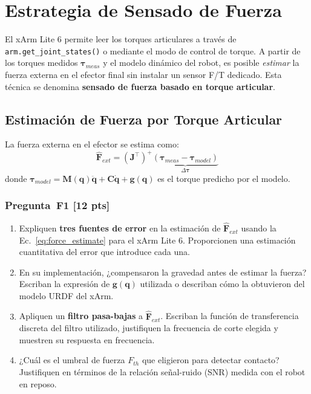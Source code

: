 \documentclass[journal,10pt,twoside]{IEEEtran}
\newcommand{\pts}[1]{\textcolor{tec_red}{\textbf{[#1 pts]}}}
\begin{document}
\section{Estrategia de Sensado de Fuerza}
\label{sec:force}

\begin{theorybox}
  El xArm Lite 6 permite leer los torques articulares a través de
  \texttt{arm.get\_joint\_states()} o mediante el modo de control de
  torque. A partir de los torques medidos $\bm{\tau}_{meas}$ y el
  modelo dinámico del robot, es posible \emph{estimar} la fuerza
  externa en el efector final sin instalar un sensor F/T dedicado.
  Esta técnica se denomina \textbf{sensado de fuerza basado en torque articular}.
\end{theorybox}

\subsection{Estimación de Fuerza por Torque Articular}

La fuerza externa en el efector se estima como:
\begin{equation}
  \hat{\bm{F}}_{ext} = \left(\bm{J}^\top\right)^+
    \underbrace{\left(\bm{\tau}_{meas} - \bm{\tau}_{model}\right)}_{\Delta\bm{\tau}}
  \label{eq:force_estimate}
\end{equation}
donde $\bm{\tau}_{model} = \bm{M}(\bm{q})\ddot{\bm{q}} +
\bm{C}\dot{\bm{q}} + \bm{g}(\bm{q})$ es el torque predicho por el modelo.

\subsubsection*{Pregunta~F1 \pts{12}}
\begin{enumerate}[label=(\alph*)]
  \item Expliquen \textbf{tres fuentes de error} en la estimación de
        $\hat{\bm{F}}_{ext}$ usando la Ec.~\eqref{eq:force_estimate}
        para el xArm Lite 6. Proporcionen una estimación cuantitativa
        del error que introduce cada una.
  \item En su implementación, ¿compensaron la gravedad antes de estimar
        la fuerza? Escriban la expresión de $\bm{g}(\bm{q})$ utilizada
        o describan cómo la obtuvieron del modelo URDF del xArm.
  \item Apliquen un \textbf{filtro pasa-bajas} a $\hat{\bm{F}}_{ext}$.
        Escriban la función de transferencia discreta del filtro
        utilizado, justifiquen la frecuencia de corte elegida
        y muestren su respuesta en frecuencia.
  \item ¿Cuál es el umbral de fuerza $F_{th}$ que eligieron para
        detectar contacto? Justifiquen en términos de la relación
        señal-ruido (SNR) medida con el robot en reposo.
\end{enumerate}
\end{document}
